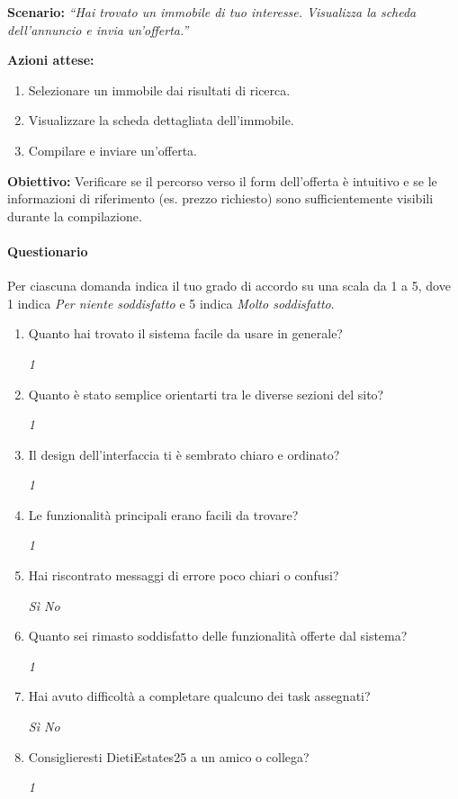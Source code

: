 \documentclass{article}
\begin{document}
\textbf{Scenario:} \textit{``Hai trovato un immobile di tuo interesse. 
Visualizza la scheda dell'annuncio e invia un'offerta.''}

\textbf{Azioni attese:}
\begin{enumerate}
    \item Selezionare un immobile dai risultati di ricerca.
    \item Visualizzare la scheda dettagliata dell'immobile.
    \item Compilare e inviare un'offerta.
\end{enumerate}

\textbf{Obiettivo:} Verificare se il percorso verso il form dell'offerta 
è intuitivo e se le informazioni di riferimento (es. prezzo richiesto) 
sono sufficientemente visibili durante la compilazione.

\paragraph{Questionario}

Per ciascuna domanda indica il tuo grado di accordo su una scala da 1 a 5,
dove 1 indica \textit{Per niente soddisfatto} e 5 indica \textit{Molto soddisfatto}.

\begin{enumerate}
    \item Quanto hai trovato il sistema facile da usare in generale?
    
    \textit{1    }

    \item Quanto è stato semplice orientarti tra le diverse sezioni del sito?
    
    \textit{1    }

    \item Il design dell'interfaccia ti è sembrato chiaro e ordinato?
    
    \textit{1    }

    \item Le funzionalità principali erano facili da trovare?
    
    \textit{1    }

    \item Hai riscontrato messaggi di errore poco chiari o confusi?
    
    \textit{Sì \quad No}

    \item Quanto sei rimasto soddisfatto delle funzionalità offerte dal sistema?
    
    \textit{1    }

    \item Hai avuto difficoltà a completare qualcuno dei task assegnati?
    
    \textit{Sì \quad No}

    \item Consiglieresti DietiEstates25 a un amico o collega?
    
    \textit{1    }
\end{enumerate}
\end{document}
